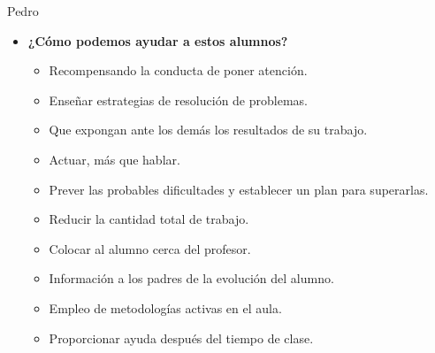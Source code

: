 \begin{opin}{\pedrocolor}{Pedro}
\begin{itemize}
\item \textbf{¿Cómo podemos ayudar a estos alumnos?}
\begin{itemize}
\item Recompensando la conducta de poner atención.
\item Enseñar estrategias de resolución de problemas.
\item Que expongan ante los demás los resultados de su trabajo.
\item Actuar, más que hablar.
\item Prever las probables dificultades y establecer un plan para superarlas.
\item Reducir la cantidad total de trabajo.
\item Colocar al alumno cerca del profesor.
\item Información a los padres de la evolución del alumno.
\item Empleo de metodologías activas en el aula.
\item Proporcionar ayuda después del tiempo de clase.
\end{itemize}
\end{itemize}


\end{opin}

